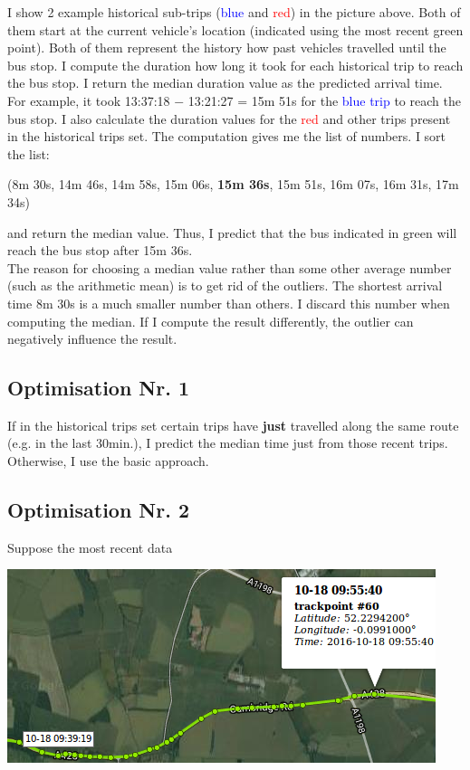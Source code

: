 \documentclass[12pt,a4paper,oneside,openright]{report}
\begin{document}
I show 2 example historical sub-trips (\textcolor{blue}{blue} and \textcolor{red}{red})
in the picture above. Both of them start at the current vehicle's location (indicated
using the most recent green point). Both of them represent the history how past
vehicles travelled until the bus stop. I compute the duration how long it
took for each historical trip to reach the bus stop. I return the median duration value
as the predicted arrival time. \\

For example, it took 13:37:18 $-$ 13:21:27 = 15m 51s for the
\textcolor{blue}{blue trip} to reach the bus stop. I also calculate the
duration values for the \textcolor{red}{red} and other trips present in the
historical trips set. The computation gives me the list of numbers.
I sort the list:

\:
\:

(8m 30s, 14m 46s, 14m 58s, 15m 06s, \textbf{15m 36s}, 15m 51s, 16m 07s, 16m 31s,
 17m 34s)

\:
\:

and return the median value. Thus, I predict that the bus indicated in green will
reach the bus stop after 15m 36s. \\

The reason for choosing a median value rather than some other average number
(such as the arithmetic mean) is to get rid of the outliers. The shortest arrival time
8m 30s is a much smaller number than others. I discard this number when computing
the median. If I compute the result differently, the outlier can negatively influence the result. \\

\subsection{Optimisation Nr. 1}

If in the historical trips set certain trips have \textbf{just} travelled along
the same route (e.g. in the last $30$min.), I predict the median time just from
those recent trips. Otherwise, I use the basic approach.

\newpage

\subsection{Optimisation Nr. 2}

Suppose the most recent data

\includegraphics[scale = 0.7]{figs/recent_trip.png} \\
\end{document}

